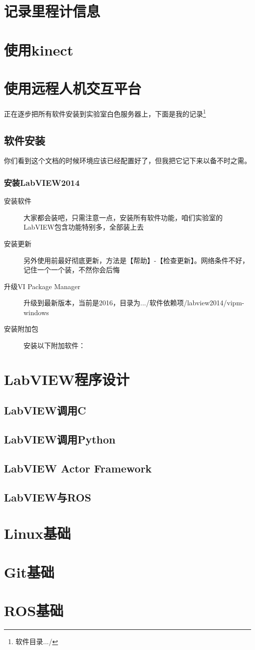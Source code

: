 \documentclass[a4paper,twoside,cs4size,fancyhdr,notitlepage]{ctexart}
\begin{document}
\section{记录里程计信息}
\section{使用kinect}

\section{使用远程人机交互平台}
    正在逐步把所有软件安装到实验室白色服务器上，下面是我的记录\footnote{软件目录.../}
\subsection{软件安装}
    你们看到这个文档的时候环境应该已经配置好了，但我把它记下来以备不时之需。
\subsubsection{安装LabVIEW2014}
\begin{description}
    \item[安装软件] 大家都会装吧，只需注意一点，安装所有软件功能，咱们实验室的LabVIEW包含功能特别多，全部装上去
    \item[安装更新] 另外使用前最好彻底更新，方法是【帮助】-【检查更新】。网络条件不好，记住一个一个装，不然你会后悔
    \item[升级VI Package Manager] 升级到最新版本，当前是2016，目录为.../软件依赖项/labview2014/vipm-windows
    \item[安装附加包] 安装以下附加软件：
\end{description}

\appendix
\section{LabVIEW程序设计}
\subsection{LabVIEW调用C}
\subsection{LabVIEW调用Python}
\subsection{LabVIEW Actor Framework}
\subsection{LabVIEW与ROS}
\section{Linux基础}
\section{Git基础}
\section{ROS基础}
\end{document}
